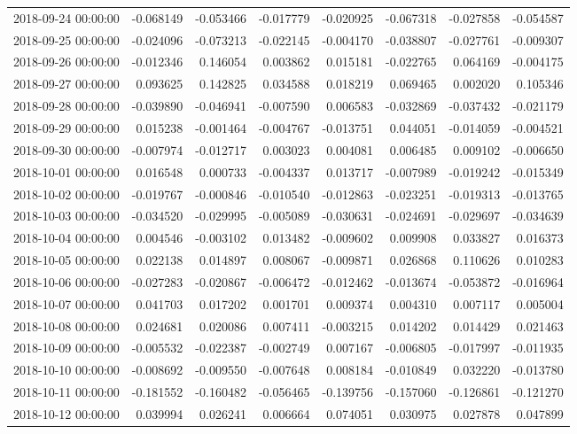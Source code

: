 \begin{tabular}{lrrrrrrr}
2018-09-24 00:00:00 & -0.068149 & -0.053466 & -0.017779 & -0.020925 & -0.067318 & -0.027858 & -0.054587 \\
2018-09-25 00:00:00 & -0.024096 & -0.073213 & -0.022145 & -0.004170 & -0.038807 & -0.027761 & -0.009307 \\
2018-09-26 00:00:00 & -0.012346 & 0.146054 & 0.003862 & 0.015181 & -0.022765 & 0.064169 & -0.004175 \\
2018-09-27 00:00:00 & 0.093625 & 0.142825 & 0.034588 & 0.018219 & 0.069465 & 0.002020 & 0.105346 \\
2018-09-28 00:00:00 & -0.039890 & -0.046941 & -0.007590 & 0.006583 & -0.032869 & -0.037432 & -0.021179 \\
2018-09-29 00:00:00 & 0.015238 & -0.001464 & -0.004767 & -0.013751 & 0.044051 & -0.014059 & -0.004521 \\
2018-09-30 00:00:00 & -0.007974 & -0.012717 & 0.003023 & 0.004081 & 0.006485 & 0.009102 & -0.006650 \\
2018-10-01 00:00:00 & 0.016548 & 0.000733 & -0.004337 & 0.013717 & -0.007989 & -0.019242 & -0.015349 \\
2018-10-02 00:00:00 & -0.019767 & -0.000846 & -0.010540 & -0.012863 & -0.023251 & -0.019313 & -0.013765 \\
2018-10-03 00:00:00 & -0.034520 & -0.029995 & -0.005089 & -0.030631 & -0.024691 & -0.029697 & -0.034639 \\
2018-10-04 00:00:00 & 0.004546 & -0.003102 & 0.013482 & -0.009602 & 0.009908 & 0.033827 & 0.016373 \\
2018-10-05 00:00:00 & 0.022138 & 0.014897 & 0.008067 & -0.009871 & 0.026868 & 0.110626 & 0.010283 \\
2018-10-06 00:00:00 & -0.027283 & -0.020867 & -0.006472 & -0.012462 & -0.013674 & -0.053872 & -0.016964 \\
2018-10-07 00:00:00 & 0.041703 & 0.017202 & 0.001701 & 0.009374 & 0.004310 & 0.007117 & 0.005004 \\
2018-10-08 00:00:00 & 0.024681 & 0.020086 & 0.007411 & -0.003215 & 0.014202 & 0.014429 & 0.021463 \\
2018-10-09 00:00:00 & -0.005532 & -0.022387 & -0.002749 & 0.007167 & -0.006805 & -0.017997 & -0.011935 \\
2018-10-10 00:00:00 & -0.008692 & -0.009550 & -0.007648 & 0.008184 & -0.010849 & 0.032220 & -0.013780 \\
2018-10-11 00:00:00 & -0.181552 & -0.160482 & -0.056465 & -0.139756 & -0.157060 & -0.126861 & -0.121270 \\
2018-10-12 00:00:00 & 0.039994 & 0.026241 & 0.006664 & 0.074051 & 0.030975 & 0.027878 & 0.047899 \\

\end{tabular}
